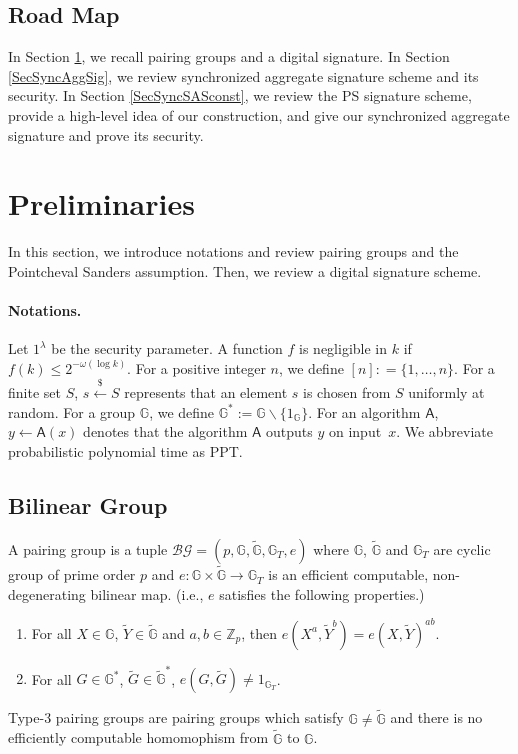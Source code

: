 \documentclass[a4paper,11pt]{fullverllncs}
\newcommand{\A}{\mathsf{A}}
\newcommand{\Z}{\mathbb{Z}}
\newcommand{\G}{\mathbb{G}}
\newcommand{\BGcal}{\mathcal{BG}}
\begin{document}
\subsection{Road Map}
In Section \ref{Prelimi}, we recall pairing groups and a digital signature.
In Section \ref{SecSyncAggSig}, we review synchronized aggregate signature scheme and its security.
In Section \ref{SecSyncSASconst}, we review the PS signature scheme, provide a high-level idea of our construction, and give our synchronized aggregate signature and prove its security.



\section{Preliminaries}\label{Prelimi}
In this section, we introduce notations and review pairing groups and the Pointcheval Sanders assumption.
Then, we review a digital signature scheme.

\paragraph{\bf Notations.}
Let $1^{\lambda}$ be the security parameter. 
A function $f$ is negligible in $k$ if $f(k) \leq 2^{-\omega(\log k)}$.
For a positive integer $n$, we define $[n]: =\{1,\dots, n\}$.
For a finite set $S$, $s \xleftarrow{\$} S$ represents that an element $s$ is chosen from $S$ uniformly at random. 
For a group $\G$, we define $\G^* := \G \backslash \{1_{\G}\}$. 
For an algorithm $\A$, $y \leftarrow \A(x)$ denotes that the algorithm $\A$ outputs $y$ on input~$x$.
We abbreviate probabilistic polynomial time as PPT.


\subsection{Bilinear Group}
A pairing group is a tuple $\BGcal = (p, \G, \widetilde{\G}, \G_T, e)$ where $\G$, $\widetilde{\G}$ and $\G_T$ are cyclic group of prime order $p$ and $e:\G \times \widetilde{\G} \rightarrow \G_T$ is an efficient computable, non-degenerating bilinear map. (i.e., $e$ satisfies the following properties.)
\begin{enumerate}
\item For all $X \in \G$, $\widetilde{Y} \in \widetilde{\G}$ and $a, b \in \Z_{p}$, then $e(X^a, \widetilde{Y}^b) = e(X, \widetilde{Y})^{ab}$.
\item For all $G \in \G^*$, $\widetilde{G} \in \widetilde{\G}^*$, $e(G, \widetilde{G}) \neq 1_{\G_T}$.
\end{enumerate}
Type-3 pairing groups \cite{GPS08} are pairing groups which satisfy $\G \neq \widetilde{\G}$ and there is no efficiently computable homomophism from $\widetilde{\G}$ to $\G$.
\end{document}
